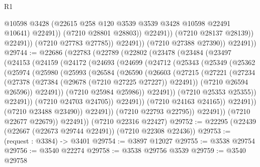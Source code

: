 \begin{lexlean}{R1}
\begin{coremodule}
                                @10598
                                @3428
                                (@22615 @258 @120 @3539 @3539 @3428 @10598 @22491 @10641)
                                @22491))
                            (@7210 @28801 @28803))
                          @22491))
                      (@7210 @28137 @28139))
                    @22491))
                (@7210 @27783 @27785))
              @22491))
          (@7210 @27388 @27390))
        @22491))
@29744 := @22686
    (@22783
      (@22789
        (@22802
          (@23478
            (@23484
              (@23497
                (@24153
                  (@24159
                    (@24172
                      (@24693
                        (@24699
                          (@24712
                            (@25343
                              (@25349
                                (@25362
                                  (@25974
                                    (@25980
                                      (@25993
                                        (@26584
                                          (@26590
                                            (@26603
                                              (@27215
                                                (@27221
                                                  (@27234
                                                    (@27378
                                                      (@27384
                                                        (@29678 (@7210 @27225 @27227))
                                                        @22491))
                                                    (@7210 @26594 @26596))
                                                  @22491))
                                              (@7210 @25984 @25986))
                                            @22491))
                                        (@7210 @25353 @25355))
                                      @22491))
                                  (@7210 @24703 @24705))
                                @22491))
                            (@7210 @24163 @24165))
                          @22491))
                      (@7210 @23488 @23490))
                    @22491))
                (@7210 @22793 @22795))
              @22491))
          (@7210 @22677 @22679))
        @22491))
    (@7210 @22316 @22427)
@29752 := @22295 (@22439 (@22667 (@22673 @29744 @22491)) (@7210 @22308 @22436))
@29753 := (request : @3384) -> @3401
@29754 := @3897 @12027
@29755 := @3538 @29754
@29756 := @3540 @22274
@29758 := @3538 @29756 @3539
@29759 := @3540 @29758

\end{coremodule}
\end{lexlean}
